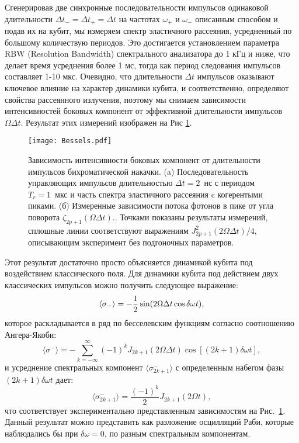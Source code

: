 Сгенерировав две синхронные последовательности импульсов одинаковой длительности $\Delta t_-\!=\!\Delta t_+\!=\!\Delta t$ на частотах $\omega_+$ и $\omega_-$ описанным способом и подав их на кубит, мы измеряем спектр эластичного рассеяния, усредненный по большому количествую периодов. Это достигается установлением параметра RBW (Resolution Bandwidth) спектрального анализатора до 1 кГц и ниже, что делает время усреднения более 1 мс, тогда как период следования импульсов составляет 1-10 мкс. Очевидно, что длительности $\Delta t$ импульсов оказывают ключевое влияние на характер динамики кубита, и соответственно, определяют свойства рассеянного излучения, поэтому мы снимаем зависимости интенсивностей боковых компонент от эффективной длительности импульсов $\Omega\Delta t$.
Результат этих измерений изображен на Рис \ref{fig: Bessels}. 
\begin{figure}\label{fig: Bessels}
\centering
\texttt{[image: Bessels.pdf]}
\caption[Зависимость интенсивности боковых компонент от длительности импульсов $\Delta t$ бихроматической накачки]{Зависимость интенсивности боковых компонент от длительности импульсов бихроматической накачки. (a) Последовательность управляющих импульсов длительностью $\Delta t=2$~нс с периодом $T_r=1$~мкс и часть спектра эластичного рассеяния c когерентыми пиками. (б) Измеренные зависимости потока фотонов в пике от угла поворота $\zeta_{2p+1}(\Omega \Delta t). $. Точками показаны результаты измерений, сплошные линии соответствуют выражениям $J^2_{2p+1}(2\Omega\Delta t)/4$, описывающим эксперимент без подгоночных параметров.}
\end{figure} 
Этот результат достаточно просто объясняется динамикой кубита под воздействием классического поля. Для динамики кубита под действием двух классических импульсов можно получить следующее выражение:
\begin{equation}
	\braket{\sigma_-} = -\frac{1}{2}\sin(2\Omega\Delta t \cos\delta\omega t), 
\end{equation}
которое раскладывается в ряд по бесселевским функциям согласно соотношению Ангера-Якоби:
\begin{equation}
	\langle \sigma^- \rangle = -\sum_{k=-\infty}^\infty (-1)^k J_{2k+1}(2\Omega \Delta t) \cos[(2k+1)\delta\omega t],
\end{equation}
и усреднение спектральных компонент $\langle \sigma^-_{2k+1}\rangle$ с определенным набегом фазы $(2k+1)\delta \omega t$ дает:
\begin{equation}
	\langle \sigma_{2k+1}^-\rangle = \frac{(-1)^k}{2}J_{2k+1}(2\Omega t),
	\label{sclass_spectr} 
\end{equation} 
что соответствует экспериментально представленным зависимостям на Рис.~\ref{fig: Bessels}. Данный результат можно представить как разложение осцилляций Раби, которые наблюдались бы при $\delta\omega =0$, по разным спектральным компонентам.

